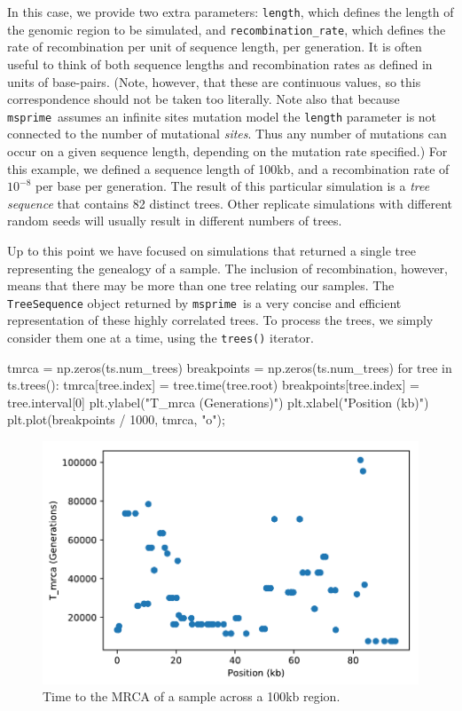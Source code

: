 \documentclass[graybox]{svmult}
\newcommand{\msprime}[0]{\texttt{msprime}}
\begin{document}
    In this case, we provide two extra parameters: \texttt{length}, which
defines the length of the genomic region to be simulated, and
\texttt{recombination\_rate}, which defines the rate of recombination
per unit of sequence length, per generation. It is often useful to
think of both sequence lengths and recombination rates as defined in units of base-pairs. (Note, however, that these are continuous values, so this
correspondence should not be taken too literally. Note also that because \msprime\ assumes an infinite sites mutation model
the \texttt{length} parameter is not connected to the number
of mutational \emph{sites}. Thus any number of mutations can occur on a
given sequence length, depending on the mutation rate specified.)
For this example, we
defined a sequence length of 100kb, and a recombination rate of
\(10^{-8}\) per base per generation. The result of this particular simulation is a
\emph{tree sequence} that contains 82 distinct trees. Other replicate
simulations with different random seeds will usually result in different
numbers of trees.

Up to this point we have focused on simulations that returned a single
tree representing the genealogy of a sample. The inclusion of
recombination, however, means that there may be more than one tree
relating our samples. The \texttt{TreeSequence} object returned by
\msprime\ is a very concise and efficient representation of these highly
correlated trees. To process the trees, we simply consider
them one at a time, using the \texttt{trees()} iterator.

\begin{pythoncode}
tmrca = np.zeros(ts.num_trees)
breakpoints = np.zeros(ts.num_trees)
for tree in ts.trees():
    tmrca[tree.index] = tree.time(tree.root)
    breakpoints[tree.index] = tree.interval[0]
plt.ylabel("T_mrca (Generations)")
plt.xlabel("Position (kb)")
plt.plot(breakpoints / 1000, tmrca, "o");
\end{pythoncode}

\begin{figure}
\begin{center}
\includegraphics[width=\textwidth]{images/plot_10.pdf}
\end{center}
\caption{\label{fig:tree_tmrcas}Time to the MRCA of
a sample across a 100kb region.}
\end{figure}
\end{document}
